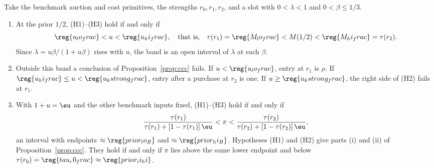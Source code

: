 \begin{proposition}\label{prop:region}
Take the benchmark auction and cost primitives, the strengths \(r_0,r_1,r_2\), and a slot with \(0<\lambda<1\) and
\(0<\beta\le1/3\).
\begin{enumerate}[label=(\alph*),leftmargin=2em]
\item At the prior \(1/2\), (H1)--(H3) hold if and only if
\[
\reg{u_lo_frac}<u<\reg{u_hi_frac},\quad\text{that is,}\quad
\tau(r_1)=\reg{M_lo_frac}<M(1/2)<\reg{M_hi_frac}=\tau(r_2).
\]
Since \(\lambda=u\beta/(1+u\beta)\) rises with \(u\), the band is an open interval of \(\lambda\) at each
\(\beta\).
\item Outside this band a conclusion of Proposition~\ref{prop:ccc} fails. If \(u<\reg{u_lo_frac}\), entry at
\(r_1\) is \(\rho\). If \(\reg{u_hi_frac}\le u<\reg{u_kstrong_frac}\), entry after a purchase at \(r_2\) is one.
If \(u\ge\reg{u_kstrong_frac}\), the right side of (H2) fails at \(r_1\).
\item With \(1+u=\eu\) and the other benchmark inputs fixed, (H1)--(H3) hold if and only if
\[
\frac{\tau(r_1)}{\tau(r_1)+[1-\tau(r_1)]\,\eu}<\pi<\frac{\tau(r_2)}{\tau(r_2)+[1-\tau(r_2)]\,\eu},
\]
an interval with endpoints \(\approx\reg{prior_lo_B}\) and \(\approx\reg{prior_hi_B}\). Hypotheses (H1) and (H2)
give parts (i) and (ii) of Proposition~\ref{prop:ccc}. They hold if and only if \(\pi\) lies above the same lower
endpoint and below \(\tau(r_0)=\reg{tau_r0_frac}\approx\reg{prior_ii_hi}\).
\end{enumerate}
\end{proposition}

